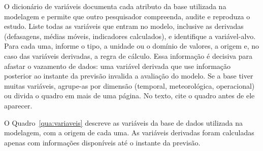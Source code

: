 \label{ap:variaveis}

\begin{orientacao}
  O dicionário de variáveis documenta cada atributo da base utilizada na modelagem e permite que outro pesquisador compreenda, audite e reproduza o estudo. Liste todas as variáveis que entram no modelo, inclusive as derivadas (defasagens, médias móveis, indicadores calculados), e identifique a variável-alvo. Para cada uma, informe o tipo, a unidade ou o domínio de valores, a origem e, no caso das variáveis derivadas, a regra de cálculo. Essa informação é decisiva para afastar o vazamento de dados: uma variável derivada que use informação posterior ao instante da previsão invalida a avaliação do modelo. Se a base tiver muitas variáveis, agrupe-as por dimensão (temporal, meteorológica, operacional) ou divida o quadro em mais de uma página. No texto, cite o quadro antes de ele aparecer.
\end{orientacao}

O Quadro~\ref{qua:variaveis} descreve as variáveis da base de dados utilizada na modelagem, com a origem de cada uma. As variáveis derivadas foram calculadas apenas com informações disponíveis até o instante da previsão.

